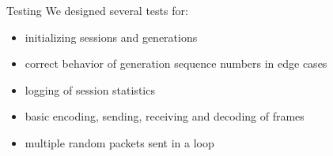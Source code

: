 \documentclass[11pt]{beamer}
\begin{document}
	\begin{frame}{Testing}
		We designed several tests for:
		\begin{itemize}
			\item initializing sessions and generations
			\item correct behavior of generation sequence numbers in edge cases
			\item logging of session statistics
			\item basic encoding, sending, receiving and decoding of frames
			\item multiple random packets sent in a loop
		\end{itemize}
	\end{frame}
\end{document}
